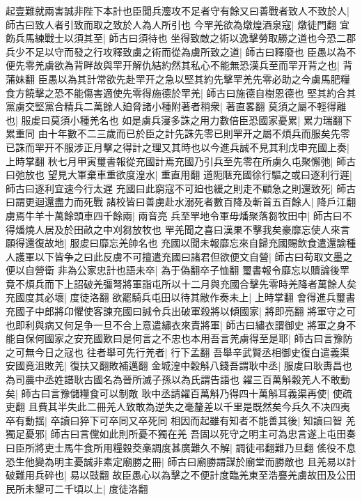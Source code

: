 起壹難就兩害誠非陛下本計也臣聞兵灋攻不足者守有餘又曰善戰者致人不致於人|{
	師古曰致人者引致而取之致於人為人所引也}
今䍐羌欲為燉煌酒泉寇|{
	燉徒門翻}
宜飭兵馬練戰士以須其至|{
	師古曰須待也}
坐得致敵之術以逸擊勞取勝之道也今恐二郡兵少不足以守而發之行攻釋致虜之術而從為虜所致之道|{
	師古曰釋廢也}
臣愚以為不便先零羌虜欲為背畔故與䍐开解仇結約然其私心不能無恐漢兵至而䍐开背之也|{
	背蒲妹翻}
臣愚以為其計常欲先赴䍐开之急以堅其約先擊䍐羌先零必助之今虜馬肥糧食方饒擊之恐不能傷害適使先零得施德於䍐羌|{
	師古曰施德自樹恩德也}
堅其約合其黨虜交堅黨合精兵二萬餘人廹脅諸小種附著者稍衆|{
	著直畧翻}
莫須之屬不輕得離也|{
	服䖍曰莫須小種羌名也}
如是虜兵寖多誅之用力數倍臣恐國家憂累|{
	累力瑞翻下累重同}
由十年數不二三歲而已於臣之計先誅先零已則䍐开之屬不煩兵而服矣先零已誅而䍐开不服涉正月擊之得計之理又其時也以今進兵誠不見其利戊申充國上奏|{
	上時掌翻}
秋七月甲寅璽書報從充國計焉充國乃引兵至先零在所虜久屯聚懈弛|{
	師古曰弛放也}
望見大軍棄車重欲度湟水|{
	重直用翻}
道阨陿充國徐行驅之或曰逐利行遲|{
	師古曰逐利宜速今行太遅}
充國曰此窮寇不可廹也緩之則走不顧急之則還致死|{
	師古曰謂更迴還盡力而死戰}
諸校皆曰善虜赴水溺死者數百降及斬首五百餘人|{
	降戶江翻}
虜焉牛羊十萬餘頭車四千餘兩|{
	兩音亮}
兵至䍐地令軍毋燔聚落芻牧田中|{
	師古曰不得燔燒人居及於田畝之中刈芻放牧也}
䍐羌聞之喜曰漢果不擊我矣豪靡忘使人來言願得還復故地|{
	服䖍曰靡忘羌帥名也}
充國以聞未報靡忘來自歸充國賜飲食遣還諭種人護軍以下皆争之曰此反虜不可擅遣充國曰諸君但欲便文自營|{
	師古曰苟取文墨之便以自營衛}
非為公家忠計也語未卒|{
	為于偽翻卒子恤翻}
璽書報令靡忘以贖論後䍐竟不煩兵而下上詔破羌彊弩將軍詣屯所以十二月與充國合擊先零時羌降者萬餘人矣充國度其必壞|{
	度徒洛翻}
欲罷騎兵屯田以待其敝作奏未上|{
	上時掌翻}
會得進兵璽書充國子中郎將卬懼使客諫充國曰誠令兵出破軍殺將以傾國家|{
	將即亮翻}
將軍守之可也即利與病又何足争一旦不合上意遣繡衣來責將軍|{
	師古曰繡衣謂御史}
將軍之身不能自保何國家之安充國歎曰是何言之不忠也本用吾言羌虜得至是耶|{
	師古曰言豫防之可無今日之寇也}
往者舉可先行羌者|{
	行下孟翻}
吾舉辛武賢丞相御史復白遣義渠安國竟沮敗羌|{
	復扶又翻敗補邁翻}
金城湟中穀斛八錢吾謂耿中丞|{
	服䖍曰耿夀昌也為司農中丞姓譜耿古國名為晉所滅子孫以為氏謂告語也}
糴三百萬斛穀羌人不敢動矣|{
	師古曰言豫儲糧食可以制敵}
耿中丞請糴百萬斛乃得四十萬斛耳義渠再使|{
	使疏吏翻}
且費其半失此二冊羌人致敢為逆失之毫釐差以千里是既然矣今兵久不决四夷卒有動揺|{
	卒讀曰猝下可卒同又卒死同}
相因而起雖有知者不能善其後|{
	知讀曰智}
羌獨足憂邪|{
	師古曰言儻如此則所憂不獨在羌}
吾固以死守之明主可為忠言遂上屯田奏曰臣所將吏士馬牛食所用糧穀茭槀調度甚廣難久不解|{
	調徒弔翻難乃旦翻}
傜役不息恐生他變為明主憂誠非素定廟勝之冊|{
	師古曰廟勝謂謀於廟堂而勝敵也}
且羌易以計破難用兵碎也|{
	易以豉翻}
故臣愚心以為擊之不便計度臨羌東至浩亹羌虜故田及公田民所未墾可二千頃以上|{
	度徒洛翻}

